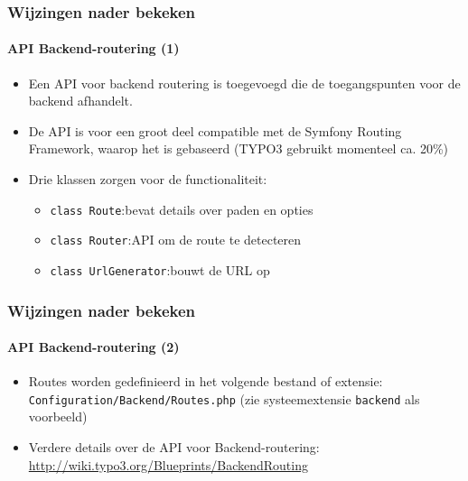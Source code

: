 \begin{frame}[fragile]
	\frametitle{Wijzingen nader bekeken}
	\framesubtitle{API Backend-routering (1)}

	\begin{itemize}
		\item Een API voor backend routering is toegevoegd die de toegangspunten voor de backend
		 	afhandelt.
		\item De API is voor een groot deel compatible met de Symfony Routing Framework, waarop
			het is gebaseerd\newline
			\small(TYPO3 gebruikt momenteel ca. 20\%)\normalsize

		\item Drie klassen zorgen voor de functionaliteit:
			\begin{itemize}
				\item \texttt{class Route}:\tabto{3.6cm}bevat details over paden en opties
				\item \texttt{class Router}:\tabto{3.6cm}API om de route te detecteren
				\item \texttt{class UrlGenerator}:\tabto{3.6cm}bouwt de URL op
			\end{itemize}
	\end{itemize}

\end{frame}

\begin{frame}[fragile]
	\frametitle{Wijzingen nader bekeken}
	\framesubtitle{API Backend-routering (2)}

	\begin{itemize}

		\item Routes worden gedefinieerd in het volgende bestand of extensie:
			\texttt{Configuration/Backend/Routes.php}\newline
			(zie systeemextensie \texttt{backend} als voorbeeld)

		\item Verdere details over de API voor Backend-routering:\newline
			\small\url{http://wiki.typo3.org/Blueprints/BackendRouting}\normalsize

	\end{itemize}

\end{frame}

